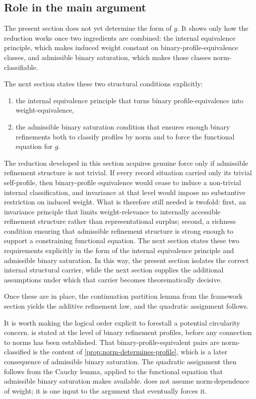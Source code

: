 \documentclass[11pt]{article}
\theoremstyle{remark}
\numberwithin{equation}{section}
\begin{document}
\subsection{Role in the main argument}

The present section does not yet determine the form of \(g\). It shows only how the reduction works once two ingredients are combined: the internal equivalence principle, which makes induced weight constant on binary-profile-equivalence classes, and admissible binary saturation, which makes those classes norm-classifiable.

The next section states these two structural conditions explicitly:
\begin{enumerate}[label=(\roman*)]
\item the internal equivalence principle that turns binary profile-equivalence into weight-equivalence,
\item the admissible binary saturation condition that ensures enough binary refinements both to classify profiles by norm and to force the functional equation for \(g\).
\end{enumerate}

The reduction developed in this section acquires genuine force only if admissible refinement structure is not trivial. If every record situation carried only its trivial self-profile, then binary-profile equivalence would cease to induce a non-trivial internal classification, and invariance at that level would impose no substantive restriction on induced weight. What is therefore still needed is twofold: first, an invariance principle that limits weight-relevance to internally accessible refinement structure rather than representational surplus; second, a richness condition ensuring that admissible refinement structure is strong enough to support a constraining functional equation. The next section states these two requirements explicitly in the form of the internal equivalence principle and admissible binary saturation. In this way, the present section isolates the correct internal structural carrier, while the next section supplies the additional assumptions under which that carrier becomes theorematically decisive.

Once these are in place, the continuation partition lemma from the
framework section yields the additive refinement law, and the
quadratic assignment follows.

It is worth making the logical order explicit to forestall a potential
circularity concern.  is stated at
the level of binary refinement profiles, before any connection to
norms has been established. That binary-profile-equivalent pairs are
norm-classified is the content of \cref{prop:norm-determines-profile},
which is a later consequence of admissible binary saturation. The
quadratic assignment then follows from the Cauchy lemma, applied to
the functional equation that admissible binary saturation makes
available.  does not assume
norm-dependence of weight; it is one input to the argument that
eventually forces it.
\end{document}
